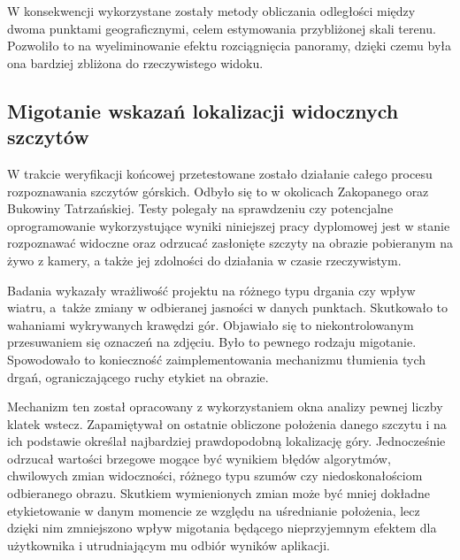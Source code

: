 W konsekwencji wykorzystane zostały metody obliczania odległości między dwoma punktami geograficznymi, celem estymowania przybliżonej skali terenu. Pozwoliło to na wyeliminowanie efektu rozciągnięcia panoramy, dzięki czemu była ona bardziej zbliżona do rzeczywistego widoku.

\subsection{Migotanie wskazań lokalizacji widocznych szczytów}

W trakcie weryfikacji końcowej przetestowane zostało działanie całego procesu rozpoznawania szczytów górskich. Odbyło się to w okolicach Zakopanego oraz Bukowiny Tatrzańskiej. Testy polegały na sprawdzeniu czy potencjalne oprogramowanie wykorzystujące wyniki niniejszej pracy dyplomowej jest w stanie rozpoznawać widoczne oraz odrzucać zasłonięte szczyty na obrazie pobieranym na żywo z kamery, a także jej zdolności do działania w czasie rzeczywistym. 

Badania wykazały wrażliwość projektu na różnego typu drgania czy wpływ wiatru, a~także zmiany w odbieranej jasności w danych punktach. Skutkowało to wahaniami wykrywanych krawędzi gór. Objawiało się to niekontrolowanym przesuwaniem się oznaczeń na zdjęciu. Było to pewnego rodzaju migotanie. Spowodowało to konieczność zaimplementowania mechanizmu tłumienia tych drgań, ograniczającego ruchy etykiet na obrazie. 

Mechanizm ten został opracowany z wykorzystaniem okna analizy pewnej liczby klatek wstecz. Zapamiętywał on ostatnie obliczone położenia danego szczytu i na ich podstawie określał najbardziej prawdopodobną lokalizację góry. Jednocześnie odrzucał wartości brzegowe mogące być wynikiem błędów algorytmów, chwilowych zmian widoczności, różnego typu szumów czy niedoskonałościom odbieranego obrazu. Skutkiem wymienionych zmian może być mniej dokładne etykietowanie w danym momencie ze względu na uśrednianie położenia, lecz dzięki nim zmniejszono wpływ migotania będącego nieprzyjemnym efektem dla użytkownika i utrudniającym mu odbiór wyników aplikacji. 
